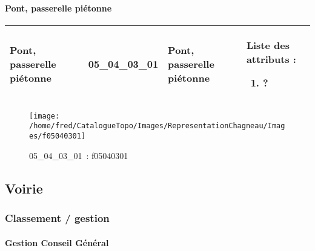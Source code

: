 \documentclass[12pt,titlepage]{book}
\begin{document}
\paragraph{Pont, passerelle piétonne}
\noindent
\vspace{\baselineskip}

\renewcommand{\arraystretch}{1.2}
\begin{supertabular}{|p{10cm}|c|p{13cm}|p{12cm}|}
 Pont, passerelle piétonne & 05\_04\_03\_01 & Pont, passerelle piétonne & Liste des attributs :
\begin{enumerate}
  \item ?\end{enumerate}
\\
\hline
\end{supertabular}
\begin{figure}[h!]
  \hfill         %
  \begin{minipage}[t]{3cm}
    \begin{center}
      \texttt{[image: /home/fred/CatalogueTopo/Images/RepresentationChagneau/Images/f05040301]}
      \caption[~05\_04\_03\_01]{\small{05\_04\_03\_01~:} \tiny{f05040301}}\label{f05040301}
    \end{center}
  \end{minipage}
\end{figure}
\subsection{Voirie}
\subsubsection{\large Classement / gestion}
\paragraph{Gestion Conseil Général}
\noindent
\vspace{\baselineskip}
\end{document}
